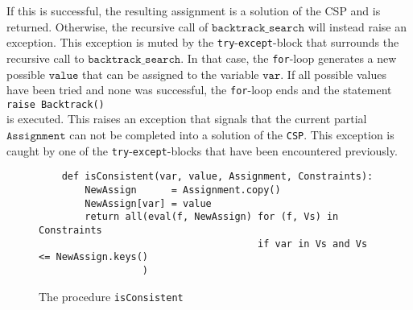 \begin{enumerate}
      If this is successful, the resulting assignment is a solution of the CSP and is returned.  Otherwise,
      the recursive call of $\texttt{backtrack\_search}$ will instead raise an exception.  This exception is muted 
      by the \texttt{try}-\texttt{except}-block that surrounds the recursive call to $\texttt{backtrack\_search}$.  In that case, the
      \texttt{for}-loop generates a new possible $\texttt{value}$ that can be assigned to the variable
      $\texttt{var}$.  If all possible values have been tried and none was successful, the \texttt{for}-loop
      ends and the statement
      \\[0.2cm]
      \hspace*{1.3cm}
      \texttt{raise Backtrack()}
      \\[0.2cm]
      is executed.  This raises an exception that signals that the current partial $\texttt{Assignment}$ can
      not be completed into a solution of the \texttt{CSP}.
      This exception is caught by one of the \texttt{try}-\texttt{except}-blocks that have been encountered previously.
\end{enumerate}


\begin{figure}[!ht]
\centering
\begin{verbatim}  
    def isConsistent(var, value, Assignment, Constraints):
        NewAssign      = Assignment.copy()
        NewAssign[var] = value
        return all(eval(f, NewAssign) for (f, Vs) in Constraints
                                      if var in Vs and Vs <= NewAssign.keys()
                  )
\end{verbatim}
\vspace*{-0.3cm}
\caption{The procedure \texttt{isConsistent}}
\label{fig:CSP-Solver.ipynb-isConsistent}
\end{figure}

